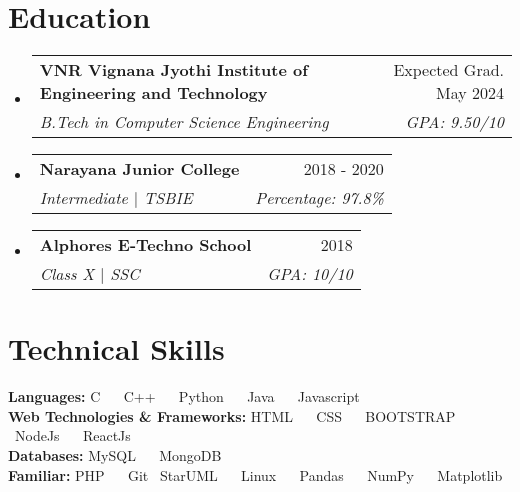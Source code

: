 \documentclass[12pt, a4paper]{article}
\makeatletter
\newcommand{\resumeItem}[1]{
  \item\small{
    {#1 \vspace{-2pt}}
  }
}
\newcommand{\resumeSubheading}[4]{
  \vspace{-2pt}\item
    \begin{tabular*}{0.97\textwidth}[t]{l@{\extracolsep{\fill}}r}
      \textbf{#1} & #2 \\
      \textit{\small#3} & \textit{\small #4} \\
    \end{tabular*}\vspace{-9pt}
}
\newcommand{\resumeSubHeadingListStart}{\begin{itemize}[leftmargin=0.15in, label={}]}
\newcommand{\resumeSubHeadingListEnd}{\end{itemize}}
\newcommand{\resumeItemListStart}{\begin{itemize}}
\newcommand{\resumeItemListEnd}{\end{itemize}\vspace{-6pt}}
\makeatother
\begin{document}
\section{Education}
  \resumeSubHeadingListStart
    \resumeSubheading
      {VNR Vignana Jyothi Institute of Engineering and Technology}{Expected Grad. May 2024}
      {B.Tech in Computer Science Engineering}{GPA: 9.50/10}
    \resumeSubheading
      {Narayana Junior College}{2018 - 2020}
      {Intermediate $|$ TSBIE}{Percentage: 97.8\% }
    \resumeSubheading
      {Alphores E-Techno School}{2018}
      {Class X $|$ SSC}{GPA: 10/10 }
  \resumeSubHeadingListEnd

\section{Technical Skills}
 \begin{itemize}[leftmargin=0.15in, label={}]
    \small{\item{
     \textbf{Languages: }{ 
            C \ \textbullet{}  \ C++ \ \textbullet{} \ Python \ \textbullet{} \ Java \  \textbullet{} \ Javascript
            \\}
        \vspace{3pt}      
     \textbf{Web Technologies \& Frameworks: }{ HTML \  \textbullet{} \ CSS
     \ \textbullet{} \ BOOTSTRAP \  \textbullet{} \ NodeJs \ \textbullet{} \ ReactJs} \\
     \vspace{3pt}
     \textbf{Databases: }{ MySQL \  \textbullet{} \ MongoDB   } \\
     \vspace{3pt}
     \textbf{Familiar: }{ PHP \  \textbullet{} \ Git \textbullet{} \ StarUML \ \textbullet{} \ Linux \ \textbullet{} \ Pandas \ \textbullet{} \ NumPy \ \textbullet{} \ Matplotlib}
    }}
 \end{itemize}


      
\end{document}
